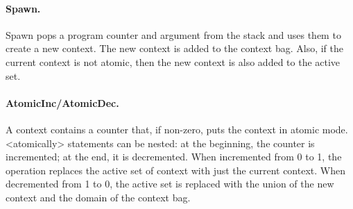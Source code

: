 \documentclass[twocolumn]{article}
\begin{document}

\paragraph{Spawn.}  Spawn pops a program counter and argument from the
stack and uses them to create a new context.  The new context is added
to the context bag.  Also, if the current context is not atomic, then
the new context is also added to the active set.

\paragraph{AtomicInc/AtomicDec.}  A context contains a counter that,
if non-zero, puts the context in atomic mode.
<{atomically}> statements can be nested: at the beginning, the
counter is incremented; at the end, it is decremented.
When incremented from 0 to 1, the operation replaces the active
set of context with just the current context.  When decremented
from 1 to 0, the active set is replaced with the union of the
new context and the domain of the context bag.

\end{document}
